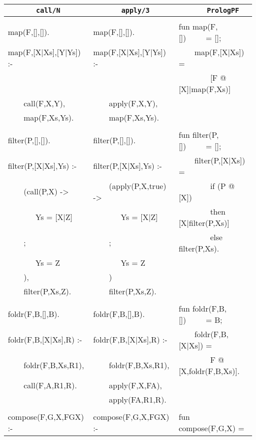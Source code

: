 \begin{table}[htb]
{\footnotesize
\tt
\begin{tabular}{| l | l | l |}
\hline
\texttt{~~~~~~~call/N}     & \texttt{~~~~~~~apply/3}   &\texttt{~~~~~~~PrologPF}\\
\hline
& & \\
map(F,[],[]).              &map(F,[],[]).              &fun map(F,[])~~~~~= [];\\
map(F,[X|Xs],[Y|Ys]) :-    &map(F,[X|Xs],[Y|Ys]) :-    &~~~~map(F,[X|Xs]) = \\
                           &                           &~~~~~~~~[F @ [X]|map(F,Xs)]\\
~~~~call(F,X,Y),           &~~~~apply(F,X,Y),          &\\
~~~~map(F,Xs,Ys).          &~~~~map(F,Xs,Ys).          &\\
& & \\
filter(P,[],[]).           &filter(P,[],[]).           &fun filter(P,[])~~~~~= [];\\
filter(P,[X|Xs],Ys) :-     &filter(P,[X|Xs],Ys) :-     &~~~~filter(P,[X|Xs]) =\\ 
~~~~(call(P,X) ->          &~~~~(apply(P,X,true) ->    &~~~~~~~~if (P @ [X])\\
~~~~~~~Ys = [X|Z]          &~~~~~~~Ys = [X|Z]          &~~~~~~~~then [X|filter(P,Xs)]\\
~~~~;                      &~~~~;                      &~~~~~~~~else filter(P,Xs).\\
~~~~~~~Ys = Z              &~~~~~~~Ys = Z              & \\
~~~~),                     &~~~~)                      & \\
~~~~filter(P,Xs,Z).        &~~~~filter(P,Xs,Z).        & \\
& & \\
foldr(F,B,[],B).           &foldr(F,B,[],B).           &fun foldr(F,B,[])~~~~~= B; \\
foldr(F,B,[X|Xs],R) :-     &foldr(F,B,[X|Xs],R) :-     &~~~~foldr(F,B,[X|Xs]) =\\
~~~~foldr(F,B,Xs,R1),      &~~~~foldr(F,B,Xs,R1),      &~~~~~~~~F @ [X,foldr(F,B,Xs)].\\
~~~~call(F,A,R1,R).        &~~~~apply(F,X,FA),         & \\
                           &~~~~apply(FA,R1,R).        & \\
& & \\
compose(F,G,X,FGX) :-      &compose(F,G,X,FGX) :-      &fun compose(F,G,X) =\\

\end{tabular}}
\end{table}
